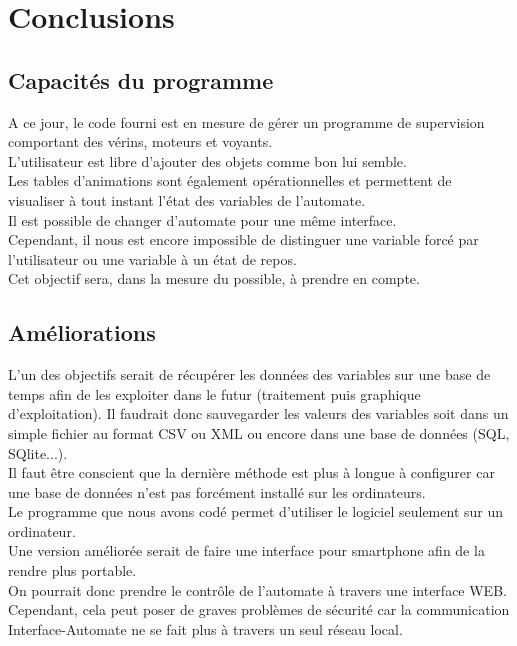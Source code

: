 {\chapter{Conclusions}

\section{Capacités du programme}

A ce jour, le code fourni est en mesure de gérer un programme de supervision comportant des vérins, moteurs et voyants. \\
L'utilisateur est libre d'ajouter des objets comme bon lui semble. \\

Les tables d'animations sont également opérationnelles et permettent de visualiser à tout instant l'état des variables de l'automate. \\
Il est possible de changer d'automate pour une même interface. \\
Cependant, il nous est encore impossible de distinguer une variable forcé par l'utilisateur ou une variable à un état de repos. \\
Cet objectif sera, dans la mesure du possible, à prendre en compte. \\


\section{Améliorations}

L'un des objectifs serait de récupérer les données des variables sur une base de temps afin de les exploiter dans le futur (traitement puis graphique d'exploitation). Il faudrait donc sauvegarder les valeurs des variables soit dans un simple fichier au format CSV ou XML ou encore dans une base de données (SQL, SQlite...). \\
Il faut être conscient que la dernière méthode est plus à longue à configurer car une base de données n'est pas forcément installé sur les ordinateurs. \\

Le programme que nous avons codé permet d'utiliser le logiciel seulement sur un ordinateur. \\
Une version améliorée serait de faire une interface pour smartphone afin de la rendre plus portable. \\
On pourrait donc prendre le contrôle de l'automate à travers une interface WEB. Cependant, cela peut poser de graves problèmes de sécurité car la communication Interface-Automate ne se fait plus à travers un seul réseau local.


}
